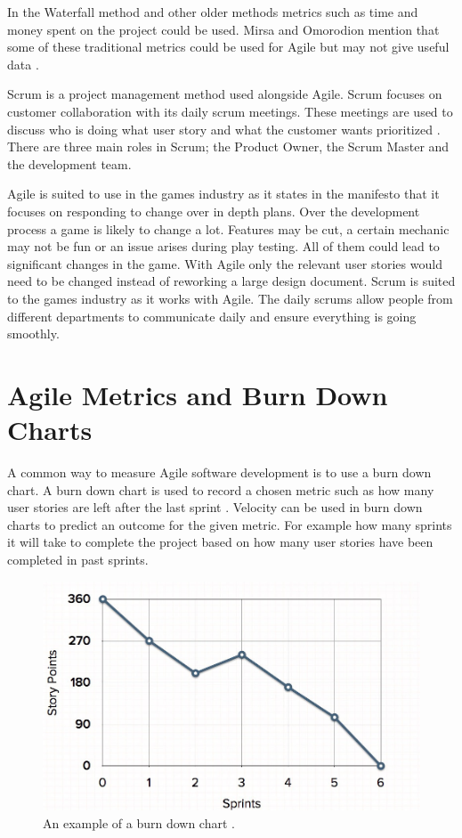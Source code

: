 \documentclass{scrartcl}
\begin{document}
In the Waterfall method and other older methods metrics such as time and money spent on the project could be used. Mirsa and Omorodion mention that some of these traditional metrics could be used for Agile but may not give useful data \cite{Misra}.

Scrum is a project management method used alongside Agile. Scrum focuses on customer collaboration with its daily scrum meetings. These meetings are used to discuss who is doing what user story and what the customer wants prioritized \cite{Sutherland}.
There are three main roles in Scrum; the Product Owner, the Scrum Master and the development team. \cite{Ktata}

Agile is suited to use in the games industry as it states in the manifesto that it focuses on responding to change over in depth plans. Over the development process a game is likely to change a lot. Features may be cut, a certain mechanic may not be fun or an issue arises during play testing. All of them could lead to significant changes in the game. With Agile only the relevant user stories would need to be changed instead of reworking a large design document. Scrum is suited to the games industry as it works with Agile. The daily scrums allow people from different departments to communicate daily and ensure everything is going smoothly.
\clearpage 
\section{Agile Metrics and Burn Down Charts}

A common way to measure Agile software development is to use a burn down chart. A burn down chart is used to record a chosen metric such as how many user stories are left after the last sprint \cite{AgileWithScrum}. Velocity can be used in burn down charts to predict an outcome for the given metric. For example how many sprints it will take to complete the project based on how many user stories have been completed in past sprints. %

\begin{figure}[h]
	\includegraphics[width=1.0\linewidth]{BDChart.jpg}
	\caption{ An example of a burn down chart \cite{MGS}.}
\end{figure}
\end{document}
